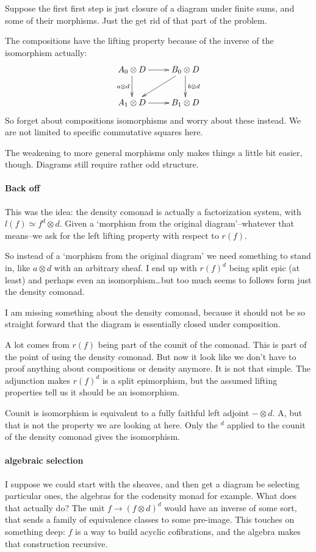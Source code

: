\documentclass[csh.tex]{subfiles}
\begin{document}
Suppose the first first step is just closure of a diagram under finite sums, and some of their morphisms. Just the get rid of that part of the problem. 

The compositions have the lifting property because of the inverse of the
isomorphism actually:
\[\xymatrix{
A_0\otimes D\ar[d]_{a\otimes d} \ar[r] & B_0\otimes D \ar[d]^{b\otimes d}\ar[dl] \\
A_1\otimes D \ar[r] & B_1\otimes D
}\]
So forget about compositions isomorphisms and worry about these instead.
We are not limited to specific commutative squares here.

The weakening to more general morphisms only makes things a little bit easier, though. Diagrams still require rather odd structure.

\paragraph{Back off}
This was the idea: the density comonad is actually a factorization system, with $l(f) \simeq f^d\otimes d$. Given a `morphism from the original diagram'--whatever that means--we ask for the left lifting property with respect to $r(f)$.

So instead of a `morphism from the original diagram' we need something to stand in, like $a\otimes d$ with an arbitrary sheaf. I end up with $r(f)^d$ being split epic (at least) and perhaps even an isomorphism\dots but too much seems to follows form just the density comonad.

I am missing something about the density comonad, because it should not be so straight forward that the diagram is essentially closed under composition. 

A lot comes from $r(f)$ being part of the counit of the comonad. This is part of the point of using the density comonad. But now it look like we don't have to proof anything about compositions or density anymore.
It is not that simple. The adjunction makes $r(f)^d$ is a split epimorphism, but the assumed lifting properties tell us it should be an isomorphism.

Counit is isomorphism is equivalent to a fully faithful left adjoint $-\otimes d$. A, but that is not the property we are looking at here. Only the $^d$ applied to the counit of the density comonad gives the isomorphism.

\paragraph{algebraic selection}
I suppose we could start with the sheaves, and then get a diagram be selecting particular ones, the algebras for the codensity monad for example. What does that actually do? 
The unit $f \to (f\otimes d)^d$ would have an inverse of some sort, that
sends a family of equivalence classes to some pre-image. This touches on
something deep: $f$ is a way to build acyclic cofibrations, and
the algebra makes that construction recursive.
\end{document}
